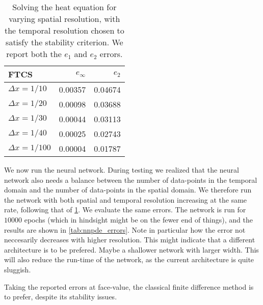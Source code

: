 \documentclass[article, a4paper, oneside]{memoir}
\begin{document}
	\begin{table}[htpb]
		\centering
		\caption{Solving the heat equation for varying spatial
			resolution, with the temporal resolution chosen to
			satisfy the stability criterion. We report both the \(
			e_1 \) and \( e_2 \) errors.} 
		\label{tab:ftsc_errors}
		\begin{tabular}{lrr}
			\toprule
			\textsc{FTCS} & \( e_\infty \) & \( e_2 \) \\
			\midrule
			\( \Delta x = 1 / 10 \) & \num{0.00357} & \num{0.04674} \\
			\( \Delta x = 1 / 20 \) & \num{0.00098} & \num{0.03688} \\
			\( \Delta x = 1 / 30 \) & \num{0.00044} & \num{0.03113} \\
			\( \Delta x = 1 / 40 \) & \num{0.00025}& \num{0.02743} \\
			\( \Delta x = 1 / 100 \) & \num{0.00004} &\num{0.01787} \\
			\bottomrule
		\end{tabular}
	\end{table}
	
	We now run the neural network. During testing we realized that the
	neural network also needs a balance between the number of data-points
	in the temporal domain and the number of data-points in the spatial
	domain. We therefore run the network with both spatial and temporal
	resolution increasing at the same rate, following that of
	\cref{tab:ftsc_errors}. We evaluate the same errors. The network is run
	for \( 10000 \) epochs (which in hindsight might be on the fewer end of
	things), and the results are shown in \cref{tab:nnpde_errors}. Note in
	particular how the error not neccesarily decreases with higher
	resolution. This might indicate that a different architecture is to be
	prefered. Maybe a shallower network with larger width. This will also
	reduce the run-time of the network, as the current architecture is
	quite sluggish.
	
	Taking the reported errors at face-value, the classical finite
	difference method is to prefer, despite its stability issues.
\end{document}
